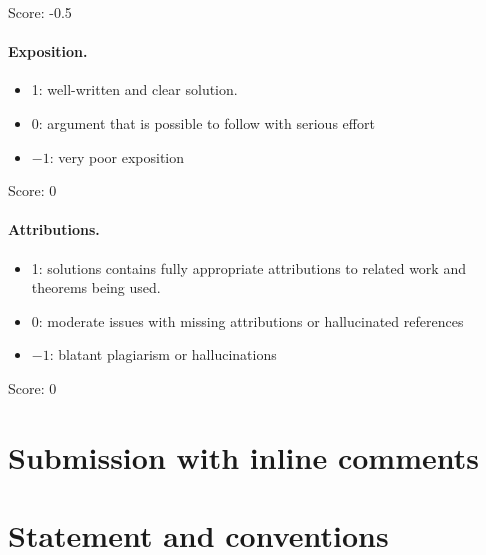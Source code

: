 \documentclass[11pt]{article}
\theoremstyle{remark}
\begin{document}
\noindent Score: -0.5

\paragraph{Exposition.}
\begin{itemize}
	\item  1: well-written and clear solution.
	\item  0: argument that is possible to follow with serious effort
	\item  $-1$: very poor exposition
\end{itemize}

\noindent Score: 0

\paragraph{Attributions.}
\begin{itemize}
	\item  1: solutions contains fully appropriate attributions
		to related work and theorems being used.
	\item  0: moderate issues with missing attributions or hallucinated references
	\item  $-1$: blatant plagiarism or hallucinations
\end{itemize}

\noindent Score: 0

\newpage
\section{Submission with inline comments}


\begin{abstract}
For a sufficiently small, fixed H\"older--Zygmund ball of conductivities
around the constant function \(1\), the minimax squared \(L^2\)-risk is,
up to logarithmic factors,
\[
n^{-2\alpha/(2\alpha+d+3)}.
\]
We prove matching polynomial upper and lower bounds for every \(d\geq2\)
and \(\alpha>1\). The upper bound uses a regularized reconstruction along
gradient trajectories, together with a variance estimate that exploits
integration along these trajectories. The lower bound uses perturbations
that oscillate in the \(d-1\) angular directions. No boundary condition
on the conductivity is imposed.
\end{abstract}

\section{Statement and conventions}
\end{document}
